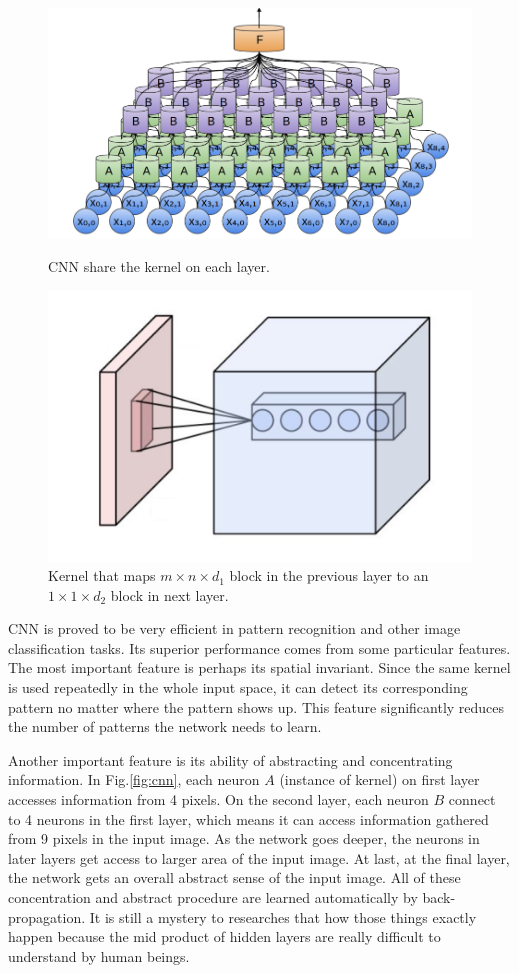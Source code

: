 \begin{figure}[H]
  \centering
  \includegraphics[width=\linewidth]{figures/cnn.png}
  \caption{CNN share the kernel on each layer.}
  \label{fig:cnn}
  \includegraphics[width=0.5\linewidth]{figures/kernel.png}
  \caption{Kernel that maps $m \times n \times d_1$ block in the previous layer to an $1 \times 1 \times d_2$ block in next layer.}
  \label{fig:kernel}
\end{figure}

CNN is proved to be very efficient in pattern recognition and other image classification tasks. Its superior performance comes from some particular features. The most important feature is perhaps its spatial invariant. Since the same kernel is used repeatedly in the whole input space, it can detect its corresponding pattern no matter where the pattern shows up. This feature significantly reduces the number of patterns the network needs to learn. 

Another important feature is its ability of abstracting and concentrating information. In Fig.\ref{fig:cnn}, each neuron $A$ (instance of kernel) on first layer accesses information from 4 pixels. On the second layer, each neuron $B$ connect to 4 neurons in the first layer, which means it can access information gathered from 9 pixels in the input image. As the network goes deeper, the neurons in later layers get access to larger area of the input image. At last, at the final layer, the network gets an overall abstract sense of the input image. All of these concentration and abstract procedure are learned automatically by back-propagation. It is still a mystery to researches that how those things exactly happen because the mid product of hidden layers are really difficult to understand by human beings.

